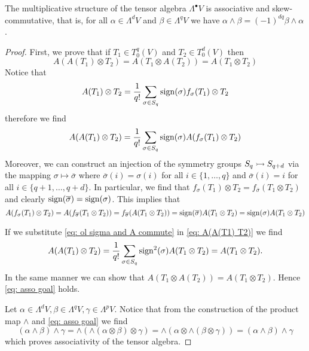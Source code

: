 \begin{proposition}\label{prop:exterior-algebra-associative-skew-commutative}
    The multiplicative structure of the tensor algebra \(\Lambda^\bullet V\) is
    associative and skew-commutative, that is, for all \(\alpha \in \Lambda^d V\)
    and \(\beta \in \Lambda^q V\) we have \(\alpha \wedge \beta = (-1)^{d q} \beta
    \wedge \alpha\).
\end{proposition}

\begin{proof}
    First, we prove that if \(T_1 \in T_0^q(V)\) and \(T_2 \in T_0^d(V)\) then
    \begin{equation}\label{eq: asso goal}
        A(A(T_1) \otimes T_2) = A(T_1 \otimes A(T_2)) =
        A(T_1 \otimes T_2)
    \end{equation} Notice that \[
        A(T_1) \otimes T_2 = \frac 1 {q!} \sum_{\sigma \in S_q}
        \operatorname{sign}(\sigma) f_\sigma(T_1) \otimes T_2
    \]
    therefore we find
    \begin{equation}\label{eq: A(A(T1) T2)}
        A(A(T_1) \otimes T_2) = \frac 1 {q!} \sum_{\sigma \in S_q}
        \operatorname{sign}(\sigma) A(f_\sigma(T_1) \otimes T_2)
    \end{equation}
    Moreover, we can construct an injection of the symmetry groups \(S_q
    \rightarrowtail S_{q + d}\) via the mapping \(\sigma \mapsto \overline \sigma\)
    where \(\overline \sigma(i) = \sigma(i)\) for all \(i \in \{1, \dots, q\}\)
    and \(\overline \sigma(i) = i\) for all \(i \in \{q + 1, \dots, q + d\}\). In
    particular, we find that \(f_\sigma(T_1) \otimes T_2 = f_{\overline \sigma}
    (T_1 \otimes T_2)\) and clearly \(\operatorname{sign}(\overline \sigma) = \operatorname{sign}(\sigma)\).
    This implies that
    \begin{equation}\label{eq: ol sigma and A commute}
        A(f_\sigma(T_1) \otimes T_2) = A(f_{\overline \sigma}(T_1 \otimes T_2))
        = f_{\overline \sigma}(A(T_1 \otimes T_2))
        = \operatorname{sign}(\overline \sigma) A(T_1 \otimes T_2)
        = \operatorname{sign}(\sigma) A(T_1 \otimes T_2)
    \end{equation}

    If we substitute \cref{eq: ol sigma and A commute} in \cref{eq: A(A(T1) T2)}
    we find
    \[
        A(A(T_1) \otimes T_2) = \frac 1 {q!} \sum_{\sigma \in S_q}
        \operatorname{sign}^2(\sigma) A(T_1 \otimes T_2) = A(T_1 \otimes T_2).
    \]
    In the same manner we can show that \(A(T_1 \otimes A(T_2)) = A(T_1 \otimes
    T_2)\). Hence \cref{eq: asso goal} holds.

    Let \(\alpha \in \Lambda^d V, \beta \in \Lambda^q V, \gamma \in \Lambda^p V\).
    Notice that from the construction of the product map \(\wedge\) and \cref{eq:
        asso goal} we find
    \[
        (\alpha \wedge \beta) \wedge \gamma
        = \wedge\left( \wedge(\alpha \otimes \beta) \otimes \gamma \right)
        = \wedge\left(\alpha \otimes \wedge(\beta \otimes \gamma) \right)
        = (\alpha \wedge \beta) \wedge \gamma
    \]
    which proves associativity of the tensor algebra.


\end{proof}
